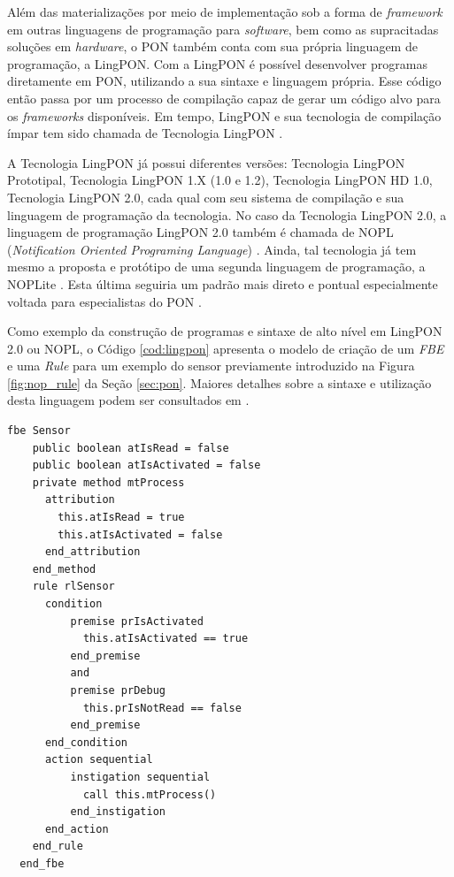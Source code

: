 Além das materializações por meio de implementação sob a forma de
\textit{framework} em outras linguagens de programação para \textit{software},
bem como as supracitadas soluções em \textit{hardware}, o PON também conta com
sua própria linguagem de programação, a LingPON. Com a LingPON é possível
desenvolver programas diretamente em PON, utilizando a sua sintaxe e linguagem
própria. Esse código então passa por um processo de compilação capaz de gerar um
código alvo para os \textit{frameworks} disponíveis. Em tempo, LingPON e sua
tecnologia de compilação ímpar tem sido chamada de Tecnologia LingPON
\cite{doc_ronszcka_2019}.

A Tecnologia LingPON já possui diferentes versões: Tecnologia LingPON
Prototipal, Tecnologia LingPON 1.X (1.0 e 1.2), Tecnologia LingPON HD 1.0,
Tecnologia LingPON 2.0, cada qual com seu sistema de compilação e sua linguagem
de programação da tecnologia. No caso da Tecnologia LingPON 2.0, a linguagem de
programação LingPON 2.0 também é chamada de NOPL (\textit{Notification Oriented
Programing Language}) \cite{doc_ronszcka_2019}. Ainda, tal tecnologia já tem
mesmo a proposta e protótipo de uma segunda linguagem de programação, a NOPLite
\cite{chierichi_2020}. Esta última seguiria um padrão mais direto e pontual
especialmente voltada para especialistas do PON \cite{doc_ronszcka_2019}.

Como exemplo da construção de programas e sintaxe de alto nível em LingPON 2.0
ou NOPL, o Código \ref{cod:lingpon} apresenta o modelo de criação de um
\textit{FBE} e uma \textit{Rule} para um exemplo do sensor previamente
introduzido na Figura \ref{fig:nop_rule} da Seção \ref{sec:pon}. Maiores
detalhes sobre a sintaxe e utilização desta linguagem podem ser consultados em
\cite{doc_ronszcka_2019}.

\begin{lstlisting}[caption = {Exemplo de construção de entidades na LingPON 2.0}, float=htb,
  source = {Fonte: Autoria própria}, language=nopl,
  label = {cod:lingpon}]
  fbe Sensor
    public boolean atIsRead = false
    public boolean atIsActivated = false
    private method mtProcess
      attribution
        this.atIsRead = true
        this.atIsActivated = false
      end_attribution
    end_method
    rule rlSensor
      condition
          premise prIsActivated
            this.atIsActivated == true
          end_premise
          and
          premise prDebug
            this.prIsNotRead == false
          end_premise
      end_condition
      action sequential
          instigation sequential
            call this.mtProcess()
          end_instigation
      end_action
    end_rule
  end_fbe
\end{lstlisting}

